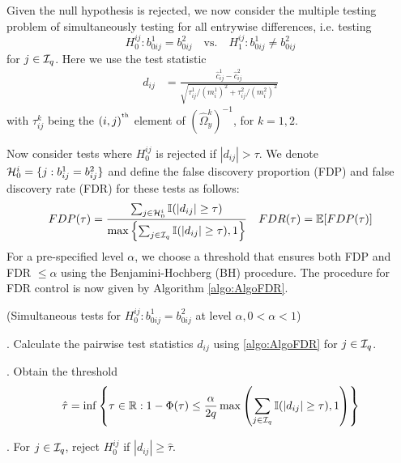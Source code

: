 Given the null hypothesis is rejected, we now consider the multiple testing problem of simultaneously testing for all entrywise differences, i.e. testing
%
$$
H_0^{ij}: b_{0 ij}^1 = b_{0ij}^2 \quad \text{vs.} \quad H_1^{ij}: b_{0 ij}^1 \neq b_{0 ij}^2 
$$
%
for $j \in {\cal{I}}_q$. Here we use the test statistic
%
\begin{align}\label{eqn:PairwiseStatistic}
d_{ij} &= \frac{\widehat c_{ij}^1 - \widehat c_{ij}^2}{\sqrt{\tau_{ij}^1/ (m_i^1)^2 + \tau_{ij}^2/ (m_i^2)^2}}
\end{align}
%
with $\tau_{ij}^k$ being the $(i,j)^{\operatorname*{^{\text{th}}}}$ element of $( \widehat \Omega_y^k)^{-1}$, for $k = 1,2$.

Now consider tests where $H_0^{ij}$ is rejected if $| d_{ij} | > \tau$. We denote ${\cal{H}}_0^i = \{ j: b_{ij}^1 = b_{ij}^2 \}$ and define the false discovery proportion (FDP) and false discovery rate (FDR) for these tests as follows:
%
$$
FDP (\tau) = \frac{\sum_{j \in {\cal{H}}_0^i} {\mathbb{I}}( |d_{ij}| \geq \tau)}{\max\left\{
\sum_{j \in {\cal{I}}_q} {\mathbb{I}}( |d_{ij}| \geq \tau), 1\right\} }\quad
FDR (\tau) = {\mathbb{E}} [ FDP (\tau) ]
$$
%
For a pre-specified level $\alpha$, we choose a threshold that ensures both FDP and FDR $\leq \alpha$ using the Benjamini-Hochberg (BH) procedure. %
The procedure for FDR control is now given by Algorithm \ref{algo:AlgoFDR}.

\begin{Algorithm}\label{algo:AlgoFDR}
(Simultaneous tests for $H_0^{ij}: b_{0 ij}^1 = b_{0 ij}^2$ at level $\alpha, 0< \alpha< 1$)

. Calculate the pairwise test statistics $d_{ij}$ using \eqref{algo:AlgoFDR} for $j \in {\cal{I}}_q$.

. Obtain the threshold
%
$$
\hat \tau = \inf \left\{\tau \in {\mathbb{R}}: 1 - \Phi(\tau) \leq \frac{\alpha}{2 q}
\max \left( \sum_{j \in {\cal{I}}_q} {\mathbb{I}}( |d_{ij}| \geq \tau), 1 \right) \right\}
$$
%

. For $j \in {\cal{I}}_q$, reject $H_0^{ij}$ if $|d_{ij}| \geq \hat \tau$.
\end{Algorithm}

